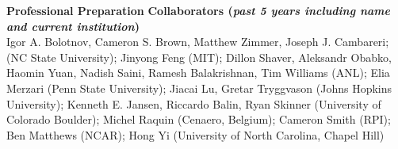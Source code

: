 \documentclass[11pt,letterpaper,english]{article}
\begin{document}
\begin{flushleft} {\bf Professional Preparation}
\vspace{-6pt}
{\bf Collaborators ({\emph{past 5 years including name and current institution}})}
{\parindent 16pt
~\\
Igor A. Bolotnov, Cameron S. Brown, Matthew Zimmer, Joseph J. Cambareri; (NC State University); Jinyong Feng (MIT); Dillon Shaver, Aleksandr Obabko, Haomin Yuan, Nadish Saini, Ramesh Balakrishnan, Tim Williams (ANL); Elia Merzari (Penn State University); Jiacai Lu, Gretar Tryggvason (Johns Hopkins University); Kenneth E. Jansen, Riccardo Balin, Ryan Skinner (University of Colorado Boulder); Michel Raquin (Cenaero, Belgium); Cameron Smith (RPI); Ben Matthews (NCAR); Hong Yi (University of North Carolina, Chapel Hill)
}

\end{flushleft}
\end{document}
